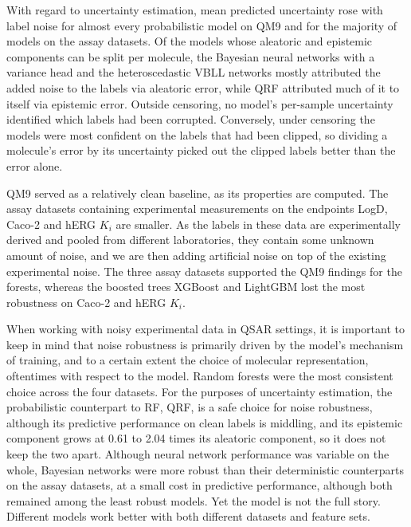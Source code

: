 With regard to uncertainty estimation, mean predicted uncertainty rose with label noise for almost every probabilistic model on QM9 and for the majority of models on the assay datasets. Of the models whose aleatoric and epistemic components can be split per molecule, the Bayesian neural networks with a variance head and the heteroscedastic VBLL networks mostly attributed the added noise to the labels via aleatoric error, while QRF attributed much of it to itself via epistemic error. Outside censoring, no model's per-sample uncertainty identified which labels had been corrupted. Conversely, under censoring the models were most confident on the labels that had been clipped, so dividing a molecule's error by its uncertainty picked out the clipped labels better than the error alone.

QM9 served as a relatively clean baseline, as its properties are computed. The assay datasets containing experimental measurements on the endpoints LogD, Caco-2 \citep{openadmet} and hERG $K_i$ \citep{Zdrazil2023} are smaller. As the labels in these data are experimentally derived and pooled from different laboratories, they contain some unknown amount of noise, and we are then adding artificial noise on top of the existing experimental noise. The three assay datasets supported the QM9 findings for the forests, whereas the boosted trees XGBoost and LightGBM lost the most robustness on Caco-2 and hERG $K_i$.

When working with noisy experimental data in QSAR settings, it is important to keep in mind that noise robustness is primarily driven by the model's mechanism of training, and to a certain extent the choice of molecular representation, oftentimes with respect to the model. Random forests were the most consistent choice across the four datasets. For the purposes of uncertainty estimation, the probabilistic counterpart to RF, QRF, is a safe choice for noise robustness, although its predictive performance on clean labels is middling, and its epistemic component grows at 0.61 to 2.04 times its aleatoric component, so it does not keep the two apart. Although neural network performance was variable on the whole, Bayesian networks were more robust than their deterministic counterparts on the assay datasets, at a small cost in predictive performance, although both remained among the least robust models. Yet the model is not the full story. Different models work better with both different datasets and feature sets.

